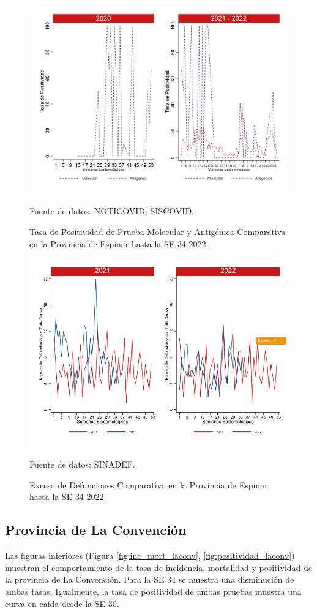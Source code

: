 \documentclass[12pt,a4paper,openany]{book}
\begin{document}
	\begin{figure}[h]
		\caption{Tasa de Positividad de Prueba Molecular y Antigénica Comparativa en la Provincia de Espinar hasta la SE 34-2022.}\label{fig:positividad_espinar}
		\begin{center}
			\includegraphics[width=0.7\linewidth]{../figuras/positividad_20_21_8.png}
		\end{center}
		{\footnotesize {Fuente de datos: NOTICOVID, SISCOVID.}}
	\end{figure}
	
	\begin{figure}[h]
		\caption{Exceso de Defunciones Comparativo en la Provincia de Espinar hasta la SE 34-2022.}\label{fig:exceso_espinar}
		\begin{center}
			\includegraphics[width=0.7\linewidth]{../figuras/exceso_8.pdf}
		\end{center}
		{\footnotesize {Fuente de datos: SINADEF.}}
	\end{figure}
	
	\clearpage
	
	\subsection*{Provincia de La Convención}
	\noindent Las figuras inferiores (Figura \ref{fig:inc_mort_laconv}, \ref{fig:positividad_laconv}) muestran el comportamiento de la tasa de incidencia, mortalidad y positividad de la provincia de La Convención. Para la SE 34 se muestra una disminución de ambas tasas. Igualmente, la tasa de positividad de ambas pruebas muestra una curva en caída desde la SE 30. 
		
\end{document}

